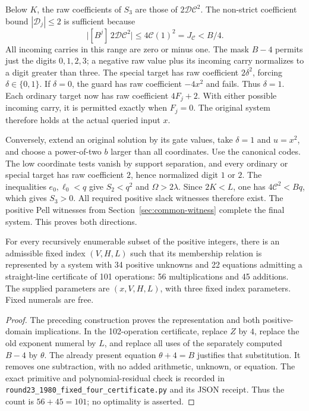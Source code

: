 Below $K$, the raw coefficients of $S_3$ are those of
$2\mathcal D\mathcal C^2$. The non-strict coefficient bound
$|\mathcal D_j|\le2$ is sufficient because
\[
 \bigl|[B^j]\,2\mathcal D\mathcal C^2\bigr|
 \le4\mathcal C(1)^2=J_{\mathcal C}<B/4.
\]
All incoming carries in this range are zero or minus one.
The mask $B-4$ permits just the digits $0,1,2,3$; a negative raw
value plus its incoming carry normalizes to a digit greater than three.
The special target has raw coefficient $2\delta^2$, forcing
$\delta\in\{0,1\}$. If $\delta=0$, the guard has raw coefficient
$-4x^2$ and fails. Thus $\delta=1$.
Each ordinary target now has raw coefficient $4F_j+2$. With either
possible incoming carry, it is permitted exactly when $F_j=0$.
The original system therefore holds at the actual queried input $x$.

Conversely, extend an original solution by its gate values, take
$\delta=1$ and $u=x^2$, and choose a power-of-two $b$ larger than all
coordinates. Use the canonical codes. The low coordinate tests vanish
by support separation, and every ordinary or special target has raw
coefficient $2$, hence normalized digit $1$ or $2$.
The inequalities $e_0,\ell_0<q$ give $S_2<q^2$ and
$\Omega>2\lambda$. Since $2K<L$, one has
$4\mathcal C^2<Bq$, which gives $S_3>0$.
All required positive slack witnesses therefore exist.
The positive Pell witnesses from Section~\ref{sec:common-witness}
complete the final system. This proves both directions.

\begin{theorem}\label{thm:best101}
For every recursively enumerable subset of the positive integers,
there is an admissible fixed index $(V,H,L)$ such that its membership
relation is represented by a system with 34 positive unknowns and
22 equations admitting a straight-line certificate of 101 operations:
56 multiplications and 45 additions. The supplied parameters are
$(x,V,H,L)$, with three fixed index parameters. Fixed numerals are free.
\end{theorem}
\begin{proof}
The preceding construction proves the representation and both
positive-domain implications. In the 102-operation certificate,
replace $Z$ by $4$, replace the old exponent numeral by $L$, and
replace all uses of the separately computed $B-4$ by $\theta$.
The already present equation $\theta+4=B$ justifies that substitution.
It removes one subtraction, with no added arithmetic, unknown, or
equation. The exact primitive and polynomial-residual check is recorded
in \texttt{round23\_1980\_fixed\_four\_certificate.py} and its JSON
receipt. Thus the count is $56+45=101$; no optimality is asserted.
\end{proof}
